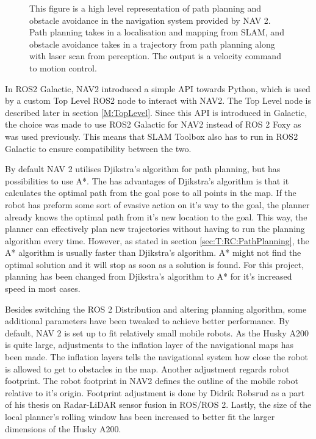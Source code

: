 \begin{figure}[htp]
    \fontsize{7}{14}\selectfont
    \centering
    
    \caption{This figure is a high level representation of path planning and obstacle avoidance in the navigation system provided by NAV 2. Path planning takes in a localisation and mapping from SLAM, and obstacle avoidance takes in a trajectory from path planning along with laser scan from perception. The output is a velocity command to motion control.}
    \label{fig:M:AN:N:Navigation}
\end{figure}

In ROS2 Galactic, NAV2 introduced a simple API towards Python, which is used by a custom Top Level ROS2 node to interact with NAV2. The Top Level node is described later in section \ref{M:TopLevel}. Since this API is introduced in Galactic, the choice was made to use ROS2 Galactic for NAV2 instead of ROS 2 Foxy as was used previously. This means that SLAM Toolbox also has to run in ROS2 Galactic to ensure compatibility between the two.

By default NAV 2 utilises Djikstra's algorithm for path planning, but has possibilities to use A*. The has advantages of Djikstra's algorithm is that it calculates the optimal path from the goal pose to all points in the map. If the robot has preform some sort of evasive action on it's way to the goal, the planner already knows the optimal path from it's new location to the goal. This way, the planner can effectively plan new trajectories without having to run the planning algorithm every time. However, as stated in section \ref{sec:T:RC:PathPlanning}, the A* algorithm is usually faster than Djikstra's algorithm. A* might not find the optimal solution and it will stop as soon as a solution is found. For this project, planning has been changed from Djikstra's algorithm to A* for it's increased speed in most cases.

Besides switching the ROS 2 Distribution and altering planning algorithm, some additional parameters have been tweaked to achieve better performance. By default, NAV 2 is set up to fit relatively small mobile robots. As the Husky A200 is quite large, adjustments to the inflation layer of the navigational maps has been made. The inflation layers tells the navigational system how close the robot is allowed to get to obstacles in the map. Another adjustment regards robot footprint. The robot footprint in NAV2 defines the outline of the mobile robot relative to it's origin. Footprint adjustment is done by Didrik Robsrud as a part of his thesis on Radar-LiDAR sensor fusion in ROS/ROS 2. Lastly, the size of the local planner's rolling window has been increased to better fit the larger dimensions of the Husky A200.

